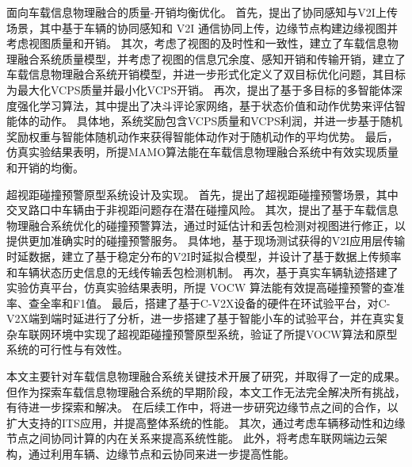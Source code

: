  面向车载信息物理融合的质量-开销均衡优化。
首先，提出了协同感知与V2I上传场景，其中基于车辆的协同感知和 V2I 通信协同上传，边缘节点构建边缘视图并考虑视图质量和开销。
其次，考虑了视图的及时性和一致性，建立了车载信息物理融合系统质量模型，并考虑了视图的信息冗余度、感知开销和传输开销，建立了车载信息物理融合系统开销模型，并进一步形式化定义了双目标优化问题，其目标为最大化VCPS质量并最小化VCPS开销。
再次，提出了基于多目标的多智能体深度强化学习算法，其中提出了决斗评论家网络，基于状态价值和动作优势来评估智能体的动作。
具体地，系统奖励包含VCPS质量和VCPS利润，并进一步基于随机奖励权重与智能体随机动作来获得智能体动作对于随机动作的平均优势。
最后，仿真实验结果表明，所提MAMO算法能在车载信息物理融合系统中有效实现质量和开销的均衡。

 超视距碰撞预警原型系统设计及实现。
首先，提出了超视距碰撞预警场景，其中交叉路口中车辆由于非视距问题存在潜在碰撞风险。
其次，提出了基于车载信息物理融合系统优化的碰撞预警算法，通过时延估计和丢包检测对视图进行修正，以提供更加准确实时的碰撞预警服务。
具体地，基于现场测试获得的V2I应用层传输时延数据，建立了基于稳定分布的V2I时延拟合模型，并设计了基于数据上传频率和车辆状态历史信息的无线传输丢包检测机制。
再次，基于真实车辆轨迹搭建了实验仿真平台，仿真实验结果表明，所提 VOCW 算法能有效提高碰撞预警的查准率、查全率和F1值。
最后，搭建了基于C-V2X设备的硬件在环试验平台，对C-V2X端到端时延进行了分析，进一步搭建了基于智能小车的试验平台，并在真实复杂车联网环境中实现了超视距碰撞预警原型系统，验证了所提VOCW算法和原型系统的可行性与有效性。

本文主要针对车载信息物理融合系统关键技术开展了研究，并取得了一定的成果。
但作为探索车载信息物理融合系统的早期阶段，本文工作无法完全解决所有挑战，有待进一步探索和解决。
在后续工作中，将进一步研究边缘节点之间的合作，以扩大支持的ITS应用，并提高整体系统的性能。
其次，通过考虑车辆移动性和边缘节点之间协同计算的内在关系来提高系统性能。
此外，将考虑车联网端边云架构，通过利用车辆、边缘节点和云协同来进一步提高性能。